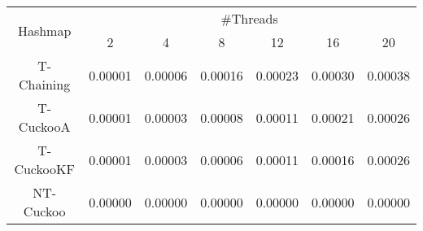 \begin{tabular}{|c|c|c|c|c|c|c|}
\hline
\multirow{2}{*}{Hashmap} & \multicolumn{6}{c|}{\#Threads}\\\cline{2-7}& 2 & 4 & 8 & 12 & 16 & 20\\
\hline
\hline
T-Chaining & 0.00001 & 0.00006 & 0.00016 & 0.00023 & 0.00030 & 0.00038\\
T-CuckooA & 0.00001 & 0.00003 & 0.00008 & 0.00011 & 0.00021 & 0.00026\\
T-CuckooKF & 0.00001 & 0.00003 & 0.00006 & 0.00011 & 0.00016 & 0.00026\\
NT-Cuckoo & 0.00000 & 0.00000 & 0.00000 & 0.00000 & 0.00000 & 0.00000\\
\hline
\end{tabular}

